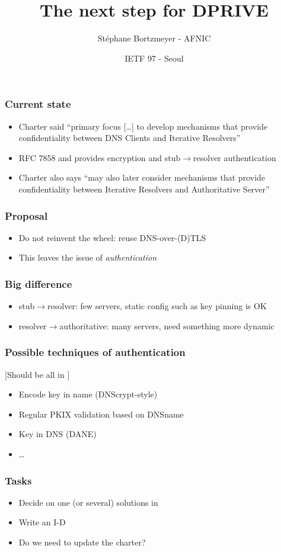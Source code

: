\documentclass[ignorenonframetext]{beamer}
\title{The next step for DPRIVE}
\author{Stéphane Bortzmeyer - AFNIC}
\date{IETF 97 - Seoul}
\begin{document}
\begin{frame}
\maketitle  
\end{frame}

\begin{frame}
  \frametitle{Current state}
  \begin{itemize}
  \item<2->Charter said ``primary focus [\ldots] to develop mechanisms that
    provide confidentiality between DNS Clients and Iterative Resolvers''
   \item<3->RFC 7858 and
      provides
     encryption and stub$\longrightarrow$resolver authentication
  \item<4->Charter also says ``may also later consider mechanisms that provide confidentiality
between Iterative Resolvers and Authoritative Server''
  \end{itemize}
\end{frame}

\begin{frame}
  \frametitle{Proposal}
  \begin{itemize}
  \item<2->Do not reinvent the wheel: reuse DNS-over-(D)TLS
  \item<3->This leaves the issue of \emph{authentication}
  \end{itemize}
\end{frame}

\begin{frame}
  \frametitle{Big difference}
  \begin{itemize}
    \item<2->stub$\longrightarrow$resolver: few servers, static config
      such as key pinning is OK
    \item<3->resolver$\longrightarrow$authoritative: many servers,
      need something more dynamic
    \end{itemize}
\end{frame}

\begin{frame}
  \frametitle{Possible techniques of authentication}
             [Should be all in ]
   \begin{itemize}
   \item<2->Encode key in name (DNScrypt-style)
   \item<3->Regular PKIX validation based on DNSname
   \item<4->Key in DNS (DANE)
   \item<5->\ldots  
   \end{itemize}
\end{frame}

\begin{frame}
  \frametitle{Tasks}
  \begin{itemize}
  \item<2->Decide on one (or several) solutions in
  \item<3->Write an I-D
  \item<4->Do we need to update the charter?  
  \end{itemize}
\end{frame}
\end{document}
